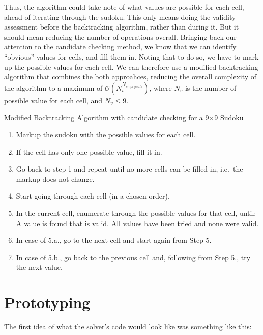 \documentclass[12pt]{report} %
\begin{document}
Thus, the algorithm could take note of what values are possible for each cell, ahead of iterating through the sudoku. This only means doing the validity assessment before the backtracking algorithm, rather than during it. But it should mean reducing the number of operations overall.
Bringing back our attention to the candidate checking method, we know that we can identify ``obvious'' values for cells, and fill them in. Noting that to do so, we have to mark up the possible values for each cell. We can therefore use a modified backtracking algorithm that combines the both approahces, reducing the overall complexity of the algorithm to a maximum of $\mathcal{O}(N_{v}^{N_{empty cells}})$, where $N_{v}$ is the number of possible value for each cell, and $N_{v}\leq 9$.

\begin{definitionbox}{Modified Backtracking Algorithm with candidate checking for a 9$\times$9 Sudoku}

  \begin{enumerate}
    \item Markup the sudoku with the possible values for each cell.
    \item If the cell has only one possible value, fill it in.
    \item Go back to step 1 and repeat until no more cells can be filled in, i.e.\ the markup does not change.
    \item Start going through each cell (in a chosen order).
    \item In the current cell, enumerate through the possible values for that cell, until:
     A value is found that is valid.
     All values have been tried and none were valid.
    \item In case of 5.a., go to the next cell and start again from Step 5.
    \item In case of 5.b., go back to the previous cell and, following from Step 5., try the next value.
  \end{enumerate}

\end{definitionbox}

\newpage
\section{Prototyping}


The first idea of what the solver's code would look like was something like this:
\end{document}
